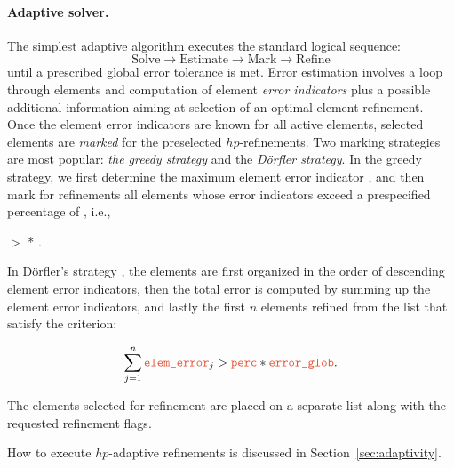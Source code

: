 \paragraph{Adaptive solver.}

The simplest adaptive algorithm executes the standard logical sequence:
\[
	\text{Solve} \longrightarrow
	\text{Estimate} \longrightarrow
	\text{Mark} \longrightarrow
	\text{Refine} 
\]
until a prescribed global error tolerance is met. Error estimation involves a loop through elements and computation of element {\em error indicators} plus a possible additional information aiming at selection of an optimal element refinement. Once the element error indicators are known for all active elements, selected elements are {\em marked} for the preselected $hp$-refinements. Two marking strategies are most popular: {\em the greedy strategy} and the {\em D\"orfler strategy}. In the greedy strategy, we first determine the maximum element error indicator , and then mark for refinements all elements whose error indicators exceed a prespecified percentage of , i.e.,
\begin{center}
	 $>$  .
\end{center}
In D\"orfler's strategy \cite{dorfler1996marking}, the elements are first organized in the order of descending element error indicators, then the total error  is computed by summing up the element error indicators, and lastly the first $n$ elements refined from the list that satisfy the criterion:

\[
\sum_{j=1}^n \var{elem\_error}_j > \var{perc} * \var{error\_glob} .
\]

The elements selected for refinement are placed on a separate list along with the requested refinement flags.

How to execute $hp$-adaptive refinements is discussed in Section~\ref{sec:adaptivity}.

%


